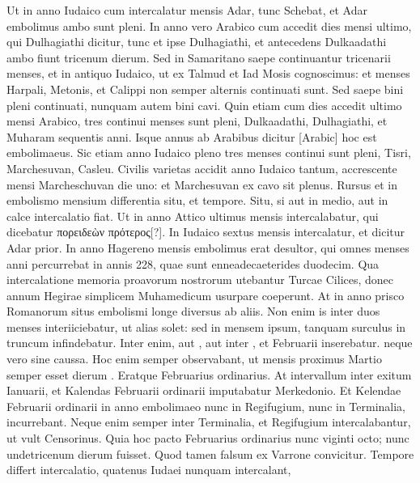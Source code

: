 Ut in anno Iudaico cum intercalatur mensis Adar, tunc
Schebat, et Adar embolimus ambo sunt pleni.
In anno vero Arabico
cum accedit dies mensi ultimo, qui Dulhagiathi dicitur, tunc et ipse
Dulhagiathi, et antecedens Dulkaadathi ambo fiunt tricenum dierum.
Sed in Samaritano saepe continuantur tricenarii menses, et in antiquo
Iudaico, ut ex Talmud et Iad Mosis cognoscimus: et menses Harpali,
Metonis, et Calippi non semper alternis continuati sunt.
Sed saepe bini
pleni continuati, nunquam autem bini cavi.
Quin etiam cum dies accedit
ultimo mensi Arabico, tres continui menses sunt pleni, Dulkaadathi,
Dulhagiathi, et Muharam sequentis anni.
Isque annus ab Arabibus
dicitur \textarabic{[Arabic]} hoc est embolimaeus.
Sic etiam anno Iudaico pleno
tres menses continui sunt pleni, Tisri, Marchesuvan, Casleu.
Civilis
varietas accidit anno Iudaico tantum, accrescente mensi Marcheschuvan
die uno: et Marchesuvan ex cavo sit plenus.
Rursus et in embolismo
mensium differentia situ, et tempore.
Situ, si aut in medio, aut in calce
intercalatio fiat.
Ut in anno Attico ultimus mensis intercalabatur, qui
dicebatur \textgreek{πορειδεὼν πρότερος[?]}.
In Iudaico sextus mensis intercalatur, et
dicitur Adar prior.
In anno Hagereno mensis embolimus erat desultor,
qui omnes menses anni percurrebat in annis 228, quae sunt enneadecaeterides
duodecim.
Qua intercalatione memoria proavorum nostrorum
utebantur Turcae Cilices, donec annum Hegirae simplicem
Muhamedicum usurpare coeperunt.
At in anno prisco Romanorum
situs embolismi longe diversus ab aliis.
Non enim is inter duos
menses interiiciebatur, ut alias solet: sed in mensem ipsum, tanquam
surculus in truncum infindebatur.
Inter  enim, aut ,
aut inter , et  Februarii inserebatur.
neque vero sine caussa.
Hoc enim semper observabant, ut mensis proximus Martio semper esset
dierum .
Eratque Februarius ordinarius.
At intervallum inter exitum
Ianuarii, et Kalendas Februarii ordinarii imputabatur Merkedonio.
Et Kelendae Februarii ordinarii in anno embolimaeo nunc in Regifugium,
nunc in Terminalia, incurrebant.
Neque enim semper inter
Terminalia, et Regifugium intercalabantur, ut vult Censorinus.
Quia hoc pacto Februarius ordinarius nunc viginti octo; nunc undetricenum
dierum fuisset.
Quod tamen falsum ex Varrone convicitur.
Tempore differt intercalatio, quatenus Iudaei nunquam intercalant,
